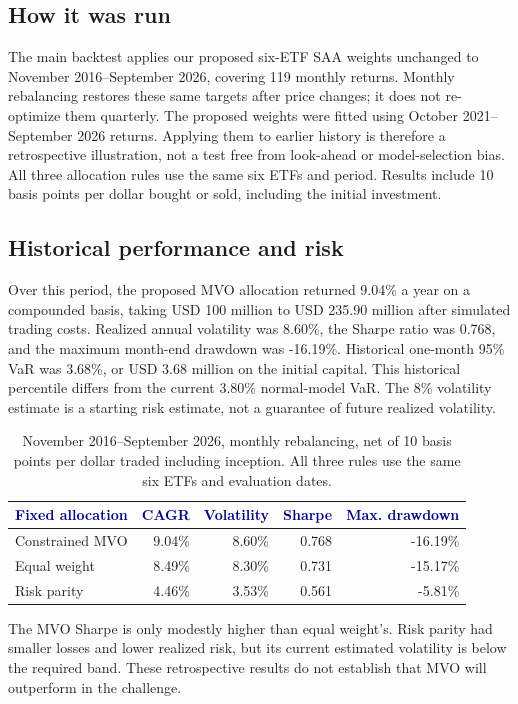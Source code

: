 \documentclass[10pt,a4paper]{article}
\newcommand{\hd}[1]{\textcolor{navy}{\textbf{#1}}}
\begin{document}
\subsection{How it was run}
The main backtest applies our proposed six-ETF SAA weights unchanged to November 2016--September 2026, covering 119 monthly returns. Monthly rebalancing restores these same targets after price changes; it does not re-optimize them quarterly. The proposed weights were fitted using October 2021--September 2026 returns. Applying them to earlier history is therefore a retrospective illustration, not a test free from look-ahead or model-selection bias. All three allocation rules use the same six ETFs and period. Results include 10 basis points per dollar bought or sold, including the initial investment.

\subsection{Historical performance and risk}
Over this period, the proposed MVO allocation returned 9.04\% a year on a compounded basis, taking USD 100 million to USD 235.90 million after simulated trading costs. Realized annual volatility was 8.60\%, the Sharpe ratio was 0.768, and the maximum month-end drawdown was -16.19\%. Historical one-month 95\% VaR was 3.68\%, or USD 3.68 million on the initial capital. This historical percentile differs from the current 3.80\% normal-model VaR. The 8\% volatility estimate is a starting risk estimate, not a guarantee of future realized volatility.

\begin{table}[H]\centering\small
\begin{tabularx}{\linewidth}{@{}Xrrrr@{}}\toprule
\hd{Fixed allocation}&\hd{CAGR}&\hd{Volatility}&\hd{Sharpe}&\hd{Max. drawdown}\\\midrule
Constrained MVO & 9.04\% & 8.60\% & 0.768 & -16.19\%\\
Equal weight & 8.49\% & 8.30\% & 0.731 & -15.17\%\\
Risk parity & 4.46\% & 3.53\% & 0.561 & -5.81\%\\
\bottomrule\end{tabularx}
\caption{November 2016--September 2026, monthly rebalancing, net of 10 basis points per dollar traded including inception. All three rules use the same six ETFs and evaluation dates.}
\end{table}
The MVO Sharpe is only modestly higher than equal weight’s. Risk parity had smaller losses and lower realized risk, but its current estimated volatility is below the required band. These retrospective results do not establish that MVO will outperform in the challenge.
\end{document}
